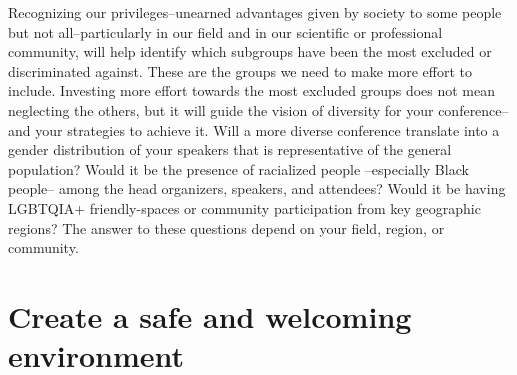 \documentclass[10pt,letterpaper]{article}
\begin{document}
Recognizing our privileges--unearned advantages given by society to some people but not all--particularly in our field and in our scientific or professional community, will help identify which subgroups have been the most excluded or discriminated against. 
These are the groups we need to make more effort to include. 
Investing more effort towards the most excluded groups does not mean neglecting the others, but it will guide the vision of diversity for your conference--and your strategies to achieve it.
Will a more diverse conference translate into a gender distribution of your speakers that is representative of the general population? 
Would it be the presence of racialized people --especially Black people-- among the head organizers, speakers, and attendees? 
Would it be having LGBTQIA+ friendly-spaces or community participation from key geographic regions?
The answer to these questions depend on your field, region, or community.




\section{Create a safe and welcoming environment}
\label{rule_inclusion}
\end{document}
